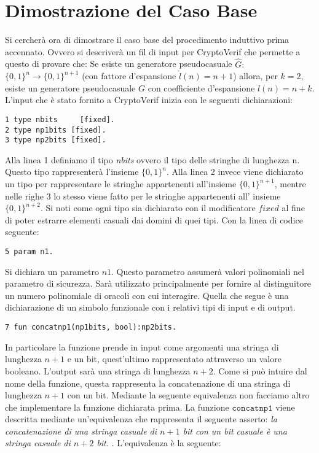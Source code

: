 \documentclass[a4paper,openright,twoside,12pt]{report}
\begin{document}
\section{Dimostrazione del Caso Base}
Si cercher\`a ora di dimostrare il caso base del procedimento induttivo prima accennato. Ovvero si descriver\`a un fil di input per CryptoVerif che permette a questo di provare che:
Se esiste un generatore pseudocasuale $\hat{G}:$ $\{0, 1\}^n \rightarrow \{0, 1\}^{n+1}$ 
(con fattore d'espansione $\hat{l}(n)=n+1$) allora, per $k=2$, esiste un generatore 
pseudocasuale $G$ con coefficiente d'espansione $l(n)=n+k$.
L'input che \`e stato fornito a CryptoVerif inizia con le seguenti dichiarazioni:
\begin{verbatim}
1 type nbits 	 [fixed].     
2 type np1bits [fixed].   
3 type np2bits [fixed].   
\end{verbatim}
Alla linea 1 definiamo il tipo \emph{nbits} ovvero il tipo delle stringhe di lunghezza n. Questo tipo rappresenter\`a l'insieme $\{0, 1\}^n$. Alla linea 2 invece viene dichiarato un tipo
per rappresentare le stringhe appartenenti all'insieme $\{0, 1\}^{n+1}$, mentre nelle righe 3 lo stesso viene fatto per le stringhe
appartenenti all' insieme $\{0, 1\}^{n+2}$. Si noti come ogni tipo sia dichiarato con il modificatore $fixed$ al fine di poter estrarre elementi casuali dai domini di quei tipi.
Con la linea di codice seguente:
\begin{verbatim}
5 param n1.
\end{verbatim}
Si dichiara un parametro $n1$. Questo parametro assumer\`a valori polinomiali nel parametro di sicurezza. 
Sar\`a utilizzato principalmente per fornire al distinguitore un numero polinomiale di oracoli con cui interagire.
Quella che segue \`e una dichiarazione di un simbolo funzionale con i relativi tipi di input e di output.
\begin{verbatim}  
7 fun concatnp1(np1bits, bool):np2bits.
\end{verbatim}
In particolare la funzione prende in input come argomenti una stringa di lunghezza $n+1$ e un bit, quest'ultimo rappresentato attraverso
un valore booleano. L'output sar\`a una stringa di lunghezza $n+2$.
Come si pu\`o intuire dal nome della funzione, questa rappresenta la concatenazione di una stringa di lunghezza $n+1$ con un bit.
Mediante la seguente equivalenza non facciamo altro che implementare la funzione dichiarata prima.
La funzione $\texttt{concatnp1}$ viene descritta mediante un'equivalenza che rappresenta il seguente asserto:
\emph{la concatenazione di una stringa casuale di $n+1$ bit con un bit casuale \`e una stringa casuale di
$n+2$ bit. }. L'equivalenza \`e la seguente:
\end{document}
